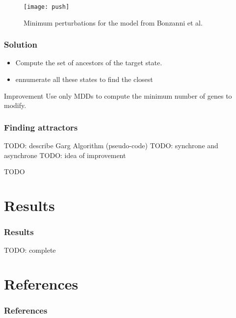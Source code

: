 \documentclass{beamer}
\begin{document}
\begin{frame}
\begin{figure}
\texttt{[image: push]}
\caption{Minimum perturbations for the model from Bonzanni et al.}
\end{figure}
\end{frame}

\begin{frame}
\frametitle{Solution}
\begin{itemize}
\item Compute the set of ancestors of the target state.

\bigskip
\item ennumerate all these states to find the closest
\end{itemize}

\bigskip
{}
\begin{block}{Improvement}
Use only MDDs to compute the minimum number of genes to modify.
\end{block}
\end{frame}


\begin{frame}
	\frametitle{Finding attractors}
	TODO: describe Garg Algorithm (pseudo-code)
	TODO: synchrone and asynchrone
	TODO: idea of improvement
\end{frame}

\begin{frame}
	TODO 

\end{frame}



\section{Results}

\begin{frame}
  \frametitle{Results}
  TODO: complete
\end{frame}


\section*{References}

\begin{frame}
  \frametitle{References}
  
  
\end{frame}
\end{document}
